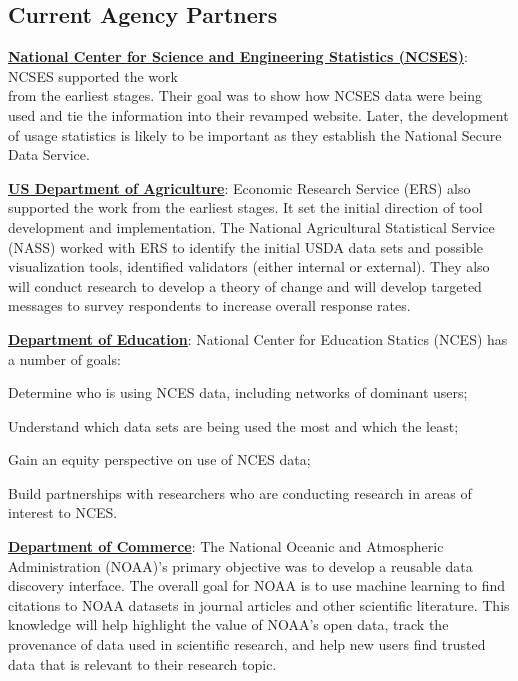 \documentclass[titlepage, 11pt]{article}
\begin{document}
{\subsection{Current Agency Partners}
\underline{\textbf{National Center for Science and Engineering Statistics (NCSES)}}: NCSES supported the work \\from the earliest stages. Their goal was to show how NCSES data were being used and tie the information into their revamped website.   Later, the development of usage statistics is likely to be important as they establish the National Secure Data Service.

\underline{\textbf{US Department of Agriculture}}: Economic Research Service (ERS) also supported the work from the earliest stages. It set the initial direction of tool development and implementation.  The National Agricultural Statistical Service (NASS) worked with ERS to identify the initial USDA data sets and possible visualization tools, identified validators (either internal or external). They also will conduct research to develop a theory of change and will develop targeted messages to survey respondents to increase overall response rates.

\underline{\textbf{Department of Education}}: National Center for Education Statics (NCES) has a number of goals: 
\begin{description}[labelindent=1cm] 
\item [Relevancy] Determine who is using NCES data, including networks of dominant users; 
\item [Priority] Understand which data sets are being used the most and which the least; 
\item [Equity] Gain an equity perspective on use of NCES data; 
\item [Community] Build partnerships with researchers who are conducting research in areas of interest to NCES. 
\end{description}

\underline{\textbf{Department of Commerce}}: The National Oceanic and Atmospheric Administration (NOAA)’s primary objective was to develop a reusable data discovery interface. The overall goal for NOAA is to use machine learning to find citations to NOAA datasets in journal articles and other scientific literature. This knowledge will help highlight the value of NOAA’s open data, track the provenance of data used in scientific research, and help new users find trusted data that is relevant to their research topic.

}
\end{document}

